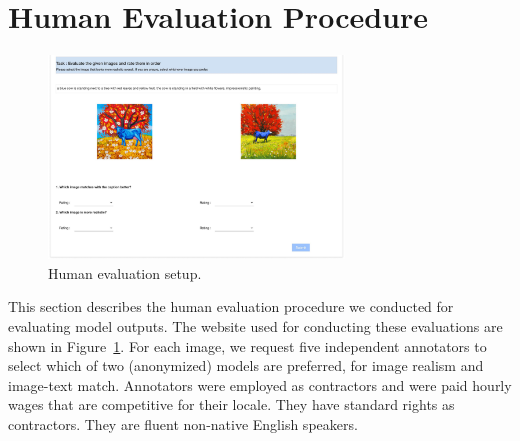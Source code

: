 \section{Human Evaluation Procedure} \label{secs:appendix_human_eval}

\begin{figure}
    \centering
    \includegraphics[width=0.7\textwidth]{figures/human_evals_website.jpg}
    \caption{Human evaluation setup.}
    \label{fig:human_evals_setup}
\end{figure}

This section describes the human evaluation procedure we conducted for evaluating model outputs. The website used for conducting these evaluations are shown in Figure~\ref{fig:human_evals_setup}. For each image, we request five independent annotators to select which of two (anonymized) models are preferred, for image realism and image-text match. Annotators were employed as contractors and were paid hourly wages that are competitive for their locale. They have standard rights as contractors. They are fluent non-native English speakers.